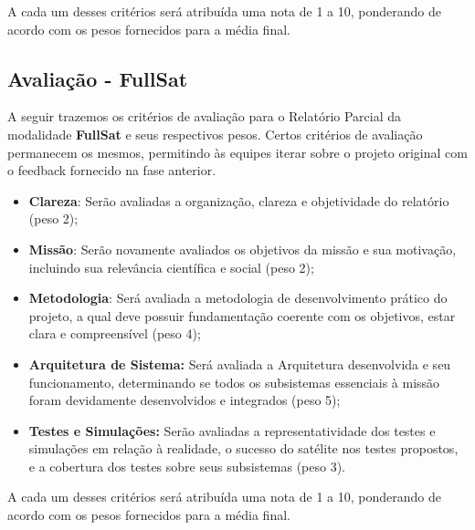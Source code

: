         A cada um desses critérios será atribuída uma nota de 1 a 10, ponderando de acordo com os pesos fornecidos para a média final.

    \subsection{Avaliação - FullSat}
        A seguir trazemos os critérios de avaliação para o Relatório Parcial da modalidade \textbf{FullSat} e seus respectivos pesos. Certos critérios de avaliação permanecem os mesmos, permitindo às equipes iterar sobre o projeto original com o feedback fornecido na fase anterior.
        
        \begin{itemize}
            \item \textbf{Clareza}: Serão avaliadas a organização, clareza e objetividade do relatório (peso 2);
                     
            \item \textbf{Missão}: Serão novamente avaliados os objetivos da missão e sua motivação, incluindo sua relevância científica e social (peso 2);
            
            \item \textbf{Metodologia}: Será avaliada a metodologia de desenvolvimento prático do projeto, a qual deve possuir fundamentação coerente com os objetivos, estar clara e compreensível (peso 4);

            \item \textbf{Arquitetura de Sistema:} Será avaliada a Arquitetura desenvolvida e seu funcionamento, determinando se todos os subsistemas essenciais à missão foram devidamente desenvolvidos e integrados (peso 5);

            \item \textbf{Testes e Simulações:} Serão avaliadas a representatividade dos testes e simulações em relação à realidade, o sucesso do satélite nos testes propostos, e a cobertura dos testes sobre seus subsistemas (peso 3).
        \end{itemize}
        
        A cada um desses critérios será atribuída uma nota de 1 a 10, ponderando de acordo com os pesos fornecidos para a média final.